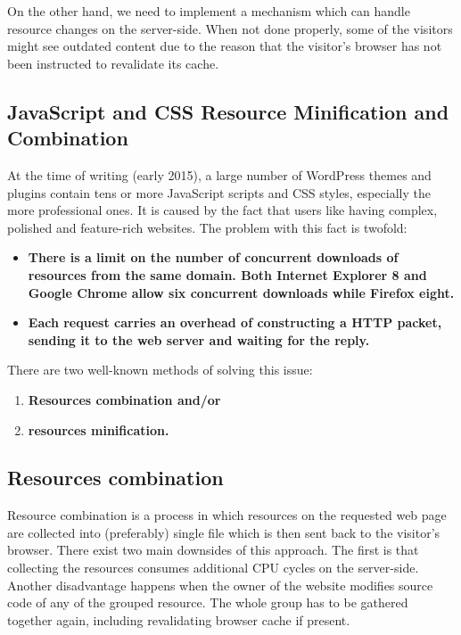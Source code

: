 On the other hand, we need to implement a mechanism which can handle resource changes on the server-side. When not done properly, some of the visitors might see outdated content due to the reason that the visitor’s browser has not been instructed to revalidate its cache.

\subsection{JavaScript and CSS Resource Minification and Combination}

At the time of writing (early 2015), a large number of WordPress themes and plugins contain tens or more JavaScript scripts and CSS styles, especially the more professional ones. It is caused by the fact that users like having complex, polished and feature-rich websites. The problem with this fact is twofold:
 
\begin{itemize}
	\item \textbf{There is a limit on the number of concurrent downloads of resources from the same domain. Both Internet Explorer 8 and Google Chrome allow six concurrent downloads while Firefox eight. \cite{SO:Browser-concurrent-downloads}}
	\item \textbf{Each request carries an overhead of constructing a HTTP packet, sending it to the web server and waiting for the reply.}
\end{itemize}

There are two well-known methods of solving this issue:

\begin{enumerate}
    \item\textbf{Resources combination and/or}
    \item\textbf{resources minification.}
  \end{enumerate}

\subsection*{Resources combination}

Resource combination is a process in which resources on the requested web page are collected into (preferably) single file which is then sent back to the visitor’s browser. There exist two main downsides of this approach. The first is that collecting the resources consumes additional CPU cycles on the server-side. Another disadvantage happens when the owner of the website modifies source code of any of the grouped resource. The whole group has to be gathered together again, including revalidating browser cache if present.

